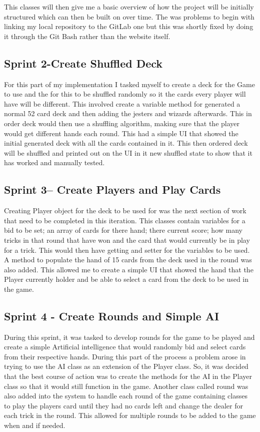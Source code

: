 This classes will then give me a basic overview of how the project will be initially structured which can then be built on over time. The was problems to begin with linking my local repository to the GitLab one but this was shortly fixed by doing it through the Git Bash rather than the website itself.
\subsection{Sprint 2-Create Shuffled Deck}
For this part of my implementation I tasked myself to create a deck for the Game to use and the for this to be shuffled randomly so it the cards every player will have will be different. This involved create a variable method for generated a normal 52 card deck and then adding the jesters and wizards afterwards. This in order deck would then use a shuffling algorithm\cite{shuffle}, making sure that the player would get different hands each round. This had a simple UI that showed the initial generated deck with all the cards contained in it. This then ordered deck will be shuffled and printed out on the UI in it new shuffled state to show that it has worked and manually tested.
\subsection{Sprint 3-- Create Players and Play Cards}
Creating Player object for the deck to be used for was the next section of work that need to be completed in this iteration. This classes contain variables for a bid to be set; an array of cards for there hand; there current score; how many tricks in that round that have won and the card that would currently be in play for a trick. This would then have getting and setter for the variables to be used. A method to populate the hand of 15 cards from the deck used in the round was also added. This allowed me to create a simple UI that showed the hand that the Player currently holder and be able to select a card from the deck to be used in the game. 
\subsection{Sprint 4 - Create Rounds and Simple AI}
During this sprint, it was tasked to develop rounds for the game to be played and create a simple Artificial intelligence that would randomly bid and select cards from their respective hands. During this part of the process a problem arose in trying to use the AI class as an extension of the Player class. So, it was decided that the best course of action was to create the methods for the AI in the Player class so that it would still function in the game. Another class called round was also added into the system to handle each round of the game containing classes to play the players card until they had no cards left and change the dealer for each trick in the round. This allowed for multiple rounds to be added to the game when and if needed. 
